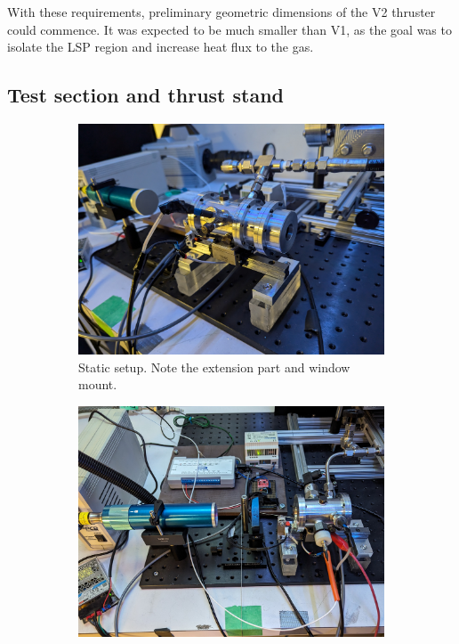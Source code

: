            With these requirements, preliminary geometric dimensions of the V2 thruster could commence. It was expected to be much smaller than V1, as the goal was to isolate the LSP region and increase heat flux to the gas.
        
        \subsection{Test section and thrust stand}

            \begin{figure}[!ht]
                \centering
                \begin{subfigure}[t]{0.45\textwidth}
                    \centering
                    \includegraphics[width=\textwidth]{assets/3 design/V2 Static configuration.jpg}
                    \caption{Static setup. Note the extension part and window mount.}
                \end{subfigure}
                \hfill
                \begin{subfigure}[t]{0.45\textwidth}
                    \centering
                    \includegraphics[width=\textwidth]{assets/3 design/V2 flowing setup.jpg}

\end{subfigure}
\end{figure}
